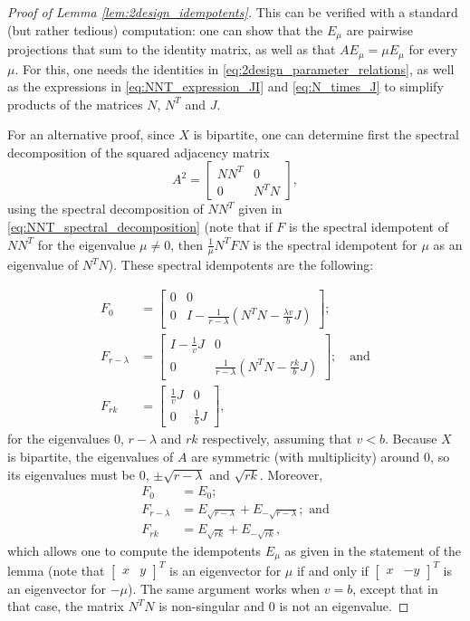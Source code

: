 \documentclass{article}
\numberwithin{equation}{section}
\begin{document}
\begin{proof}[Proof of Lemma \ref{lem:2design_idempotents}]
This can be verified with a standard (but rather tedious) computation: one can show that the $E_\mu$ are pairwise projections that sum to the identity matrix, as well as that $AE_\mu = \mu E_\mu$ for every $\mu$. For this, one needs the identities in \eqref{eq:2design_parameter_relations}, as well as the expressions in \eqref{eq:NNT_expression_JI} and \eqref{eq:N_times_J} to simplify products of the matrices $N$, $N^T$ and $J$.

For an alternative proof, since $X$ is bipartite, one can determine first the spectral decomposition of the squared adjacency matrix
\[
A^2 = \begin{bmatrix}
NN^T & 0 \\
0 & N^TN
\end{bmatrix},
\]
using the spectral decomposition of $NN^T$ given in \eqref{eq:NNT_spectral_decomposition} (note that if $F$ is the spectral idempotent of $NN^T$ for the eigenvalue $\mu \neq 0$, then $\frac{1}{\mu}N^TFN$ is the spectral idempotent for $\mu$ as an eigenvalue of $N^TN$). These spectral idempotents are the following:

\begin{align*}
F_{0} &= 
\begin{bmatrix}
0 & 0 \\
0 & I - \frac{1}{r-\lambda}\left(N^TN - \frac{\lambda v}{b}J\right)
\end{bmatrix}; \\
F_{r-\lambda} &= 
\begin{bmatrix}
I - \frac{1}{v}J & 0 \\
0 & \frac{1}{r-\lambda}\left(N^TN - \frac{rk}{b}J\right)
\end{bmatrix}
; \quad \text{and}\\
F_{rk} &= \begin{bmatrix}
\frac{1}{v}J & 0 \\
0 & \frac{1}{b}J
\end{bmatrix},
\end{align*}
for the eigenvalues $0$, $r - \lambda$ and $rk$ respectively, assuming that $v < b$. Because $X$ is bipartite, the eigenvalues of $A$ are symmetric (with multiplicity) around $0$, so its eigenvalues must be $0$, $\pm \sqrt{r-\lambda}$ and $\sqrt{rk}$. Moreover,
\[
\begin{split}
F_0 &= E_0; \\
F_{r-\lambda} &= E_{\sqrt{r-\lambda}} + E_{-\sqrt{r-\lambda}}; \text{ and} \\
F_{rk} &= E_{\sqrt{rk}} + E_{-\sqrt{rk}},
\end{split}
\]
which allows one to compute the idempotents $E_{\mu}$ as given in the statement of the lemma (note that $\begin{bmatrix}x & y\end{bmatrix}^T$ is an eigenvector for $\mu$ if and only if $\begin{bmatrix}x & -y\end{bmatrix}^T$ is an eigenvector for $-\mu$). The same argument works when $v = b$, except that in that case, the matrix $N^TN$ is non-singular and $0$ is not an eigenvalue.
\end{proof}
\end{document}
